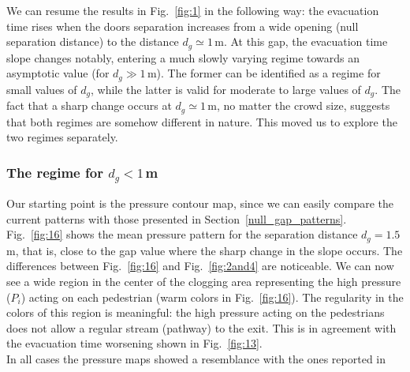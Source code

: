 We can resume the results in Fig.~\ref{fig:1} in the following way: the 
evacuation time rises when the doors separation increases from a wide opening 
(null separation distance) to the distance $d_g\simeq1\,$m. At this gap, the 
evacuation time slope changes notably, entering a much slowly 
varying regime towards an asymptotic value (for $d_g\gg1\,$m).  The former can 
be identified as a regime for small values of $d_g$, while the latter is valid 
for moderate to large values of $d_g$. The fact that a sharp change occurs at 
$d_g\simeq1\,$m, no matter the crowd size, suggests that both regimes are 
somehow different in nature. This moved us to explore the two regimes 
separately. \\

\subsubsection{\label{small_regime} The regime for $d_g<1\,$m}

Our starting point is the pressure contour map, since we can easily compare the 
current patterns with those presented in Section~\ref{null_gap_patterns}. 
Fig.~\ref{fig:16} shows the mean pressure pattern for the separation distance 
$d_g=1.5\,$m, that is, close to the gap value where the sharp change in the 
slope occurs. The differences between Fig.~\ref{fig:16} and 
Fig.~\ref{fig:2and4} are noticeable. We can now see a wide region in the center of 
the clogging area representing the high pressure ($P_i$) acting 
on each pedestrian (warm colors in Fig.~\ref{fig:16}). The regularity in the 
colors of this region is meaningful: the high pressure acting on the pedestrians 
does not allow a regular stream (pathway) to the exit. This is in agreement with 
the evacuation time worsening shown in Fig.~\ref{fig:13}.   \\

{\color{red} In all cases the pressure maps showed a resemblance with the ones reported in~\cite{Zhang}}

